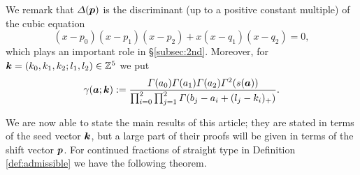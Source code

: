 \documentclass[a4paper,12pt]{article}
\theoremstyle{plain}
\def\Z{\mathbb{Z}}
\def\vG{\varGamma}
\def\vD{\varDelta}
\def\ba{\mbox{\boldmath $a$}}
\def\bk{\mbox{\boldmath $k$}}
\def\bp{\mbox{\boldmath $p$}}
\begin{document}
We remark that $\vD(\bp)$ is the discriminant (up to a positive 
constant multiple) of the cubic equation 
\[
(x-p_0)(x-p_1)(x-p_2) + x (x-q_1) (x-q_2) = 0,  
\]   
which plays an important role in \S \ref{subsec:2nd}.  
Moreover, for $\bk = (k_0, k_1, k_2; l_1, l_2) \in \Z^5$ we put  
\begin{equation} \label{eqn:gamma(a)} 
\gamma(\ba; \bk) 
:= \dfrac{\vG(a_0) \vG(a_1) \vG(a_2) \vG^2(s(\ba)) }{ \prod_{i=0}^2 
\prod_{j=1}^2 \vG(b_j-a_i+(l_j-k_i)_+)}.     
\end{equation}
\par
We are now able to state the main results of this article; they are stated 
in terms of the seed vector $\bk$, but a large part of their proofs will be 
given in terms of the shift vector $\bp$. 
For continued fractions of straight type in Definition \ref{def:admissible} 
we have the following theorem.     
\end{document}
